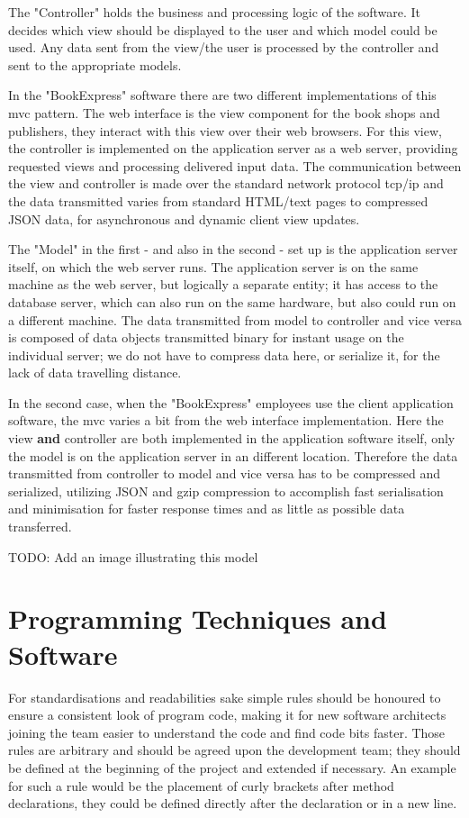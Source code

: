 \documentclass[11pt,a4paper,oneside,svgnames]{report}
\begin{document}
The "Controller" holds the business and processing logic of the software. It decides which view should be displayed to the user and which model could be used. Any data sent from the view/the user is processed by the controller and sent to the appropriate models.

In the "BookExpress" software there are two different implementations of this \gls{mvc} pattern. The web interface is the view component for the book shops and publishers, they interact with this view over their web browsers.
For this view, the controller is implemented on the application server as a web server, providing requested views and processing delivered input data. The communication between the view and controller is made over the standard network protocol tcp/ip and the data transmitted varies from standard HTML/text pages to compressed JSON data, for asynchronous and dynamic client view updates.

The "Model" in the first - and also in the second - set up is the application server itself, on which the web server runs. The application server is on the same machine as the web server, but logically a separate entity; it has access to the database server, which can also run on the same hardware, but also could run on a different machine. The data transmitted from model to controller and vice versa is composed of data objects transmitted binary for instant usage on the individual server; we do not have to compress data here, or serialize it, for the lack of data travelling distance.

In the second case, when the "BookExpress" employees use the client application software, the \gls{mvc} varies a bit from the web interface implementation. Here the view \textbf{and} controller are both implemented in the application software itself, only the model is on the application server in an different location. Therefore the data transmitted from controller to model and vice versa has to be compressed and serialized, utilizing JSON and gzip compression to accomplish fast serialisation and minimisation for faster response times and as little as possible data transferred.

TODO: Add an image illustrating this model

\section{Programming Techniques and Software}
For standardisations and readabilities sake simple rules should be honoured to ensure a consistent look of program code, making it for new software architects joining the team easier to understand the code and find code bits faster. Those rules are arbitrary and should be agreed upon the development team; they should be defined at the beginning of the project and extended if necessary. An example for such a rule would be the placement of curly brackets after method declarations, they could be defined directly after the declaration or in a new line.
\end{document}
